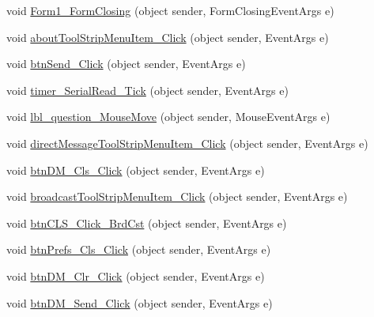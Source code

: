 \begin{DoxyCompactItemize}
\item 
void \hyperlink{class_sr_p___classroom_inq_1_1frm_classrrom_inq_a6a257d6e30f5e9370c72b475aff7aafa}{\-Form1\-\_\-\-Form\-Closing} (object sender, \-Form\-Closing\-Event\-Args e)
\item 
void \hyperlink{class_sr_p___classroom_inq_1_1frm_classrrom_inq_aa814f588d2d4abeed64487cdb14fab7b}{about\-Tool\-Strip\-Menu\-Item\-\_\-\-Click} (object sender, \-Event\-Args e)
\item 
void \hyperlink{class_sr_p___classroom_inq_1_1frm_classrrom_inq_a42ab065ed95503b1313dbed6395cde09}{btn\-Send\-\_\-\-Click} (object sender, \-Event\-Args e)
\item 
void \hyperlink{class_sr_p___classroom_inq_1_1frm_classrrom_inq_a998211ade205915b4c2e1ccfff8f0243}{timer\-\_\-\-Serial\-Read\-\_\-\-Tick} (object sender, \-Event\-Args e)
\item 
void \hyperlink{class_sr_p___classroom_inq_1_1frm_classrrom_inq_a54d8d58aacb4265d0e3083f8153b0595}{lbl\-\_\-question\-\_\-\-Mouse\-Move} (object sender, \-Mouse\-Event\-Args e)
\item 
void \hyperlink{class_sr_p___classroom_inq_1_1frm_classrrom_inq_a9c1ad2d103578bed5a65f1c744124f03}{direct\-Message\-Tool\-Strip\-Menu\-Item\-\_\-\-Click} (object sender, \-Event\-Args e)
\item 
void \hyperlink{class_sr_p___classroom_inq_1_1frm_classrrom_inq_a1c2055b50c4476070c6272f0462ee640}{btn\-D\-M\-\_\-\-Cls\-\_\-\-Click} (object sender, \-Event\-Args e)
\item 
void \hyperlink{class_sr_p___classroom_inq_1_1frm_classrrom_inq_a5a5c0fb174e0ecda3389793bcb45d6e7}{broadcast\-Tool\-Strip\-Menu\-Item\-\_\-\-Click} (object sender, \-Event\-Args e)
\item 
void \hyperlink{class_sr_p___classroom_inq_1_1frm_classrrom_inq_ad06f37a98dfdb9ea7d37231cf0725836}{btn\-C\-L\-S\-\_\-\-Click\-\_\-\-Brd\-Cst} (object sender, \-Event\-Args e)
\item 
void \hyperlink{class_sr_p___classroom_inq_1_1frm_classrrom_inq_a382353840dd2e621af4b5a63ddb909fa}{btn\-Prefs\-\_\-\-Cls\-\_\-\-Click} (object sender, \-Event\-Args e)
\item 
void \hyperlink{class_sr_p___classroom_inq_1_1frm_classrrom_inq_af62b391dc8305d62127bed60356d1a77}{btn\-D\-M\-\_\-\-Clr\-\_\-\-Click} (object sender, \-Event\-Args e)
\item 
void \hyperlink{class_sr_p___classroom_inq_1_1frm_classrrom_inq_ad2f643a739ae01acd4348b4fc6308c8c}{btn\-D\-M\-\_\-\-Send\-\_\-\-Click} (object sender, \-Event\-Args e)

\end{DoxyCompactItemize}
